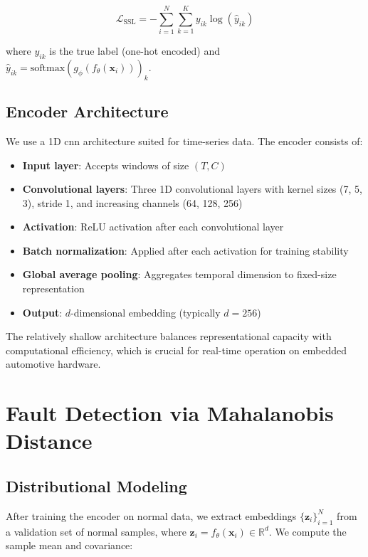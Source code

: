 \begin{equation}
\mathcal{L}_{\text{SSL}} = -\sum_{i=1}^{N} \sum_{k=1}^{K} y_{ik} \log(\hat{y}_{ik})
\end{equation}

where $y_{ik}$ is the true label (one-hot encoded) and $\hat{y}_{ik} = \text{softmax}(g_\phi(f_\theta(\mathbf{x}_i)))_k$.

\subsection{Encoder Architecture}

We use a 1D \gls{cnn} architecture \parencite{kiranyaz20191d} suited for time-series data. The encoder consists of:

\begin{itemize}
    \item \textbf{Input layer}: Accepts windows of size $(T, C)$
    \item \textbf{Convolutional layers}: Three 1D convolutional layers with kernel sizes (7, 5, 3), stride 1, and increasing channels (64, 128, 256)
    \item \textbf{Activation}: ReLU activation after each convolutional layer
    \item \textbf{Batch normalization}: Applied after each activation for training stability
    \item \textbf{Global average pooling}: Aggregates temporal dimension to fixed-size representation
    \item \textbf{Output}: $d$-dimensional embedding (typically $d=256$)
\end{itemize}

The relatively shallow architecture balances representational capacity with computational efficiency, which is crucial for real-time operation on embedded automotive hardware.

\section{Fault Detection via Mahalanobis Distance}

\subsection{Distributional Modeling}

After training the encoder on normal data, we extract embeddings $\{\mathbf{z}_i\}_{i=1}^{N}$ from a validation set of normal samples, where $\mathbf{z}_i = f_\theta(\mathbf{x}_i) \in \mathbb{R}^{d}$. We compute the sample mean and covariance:

